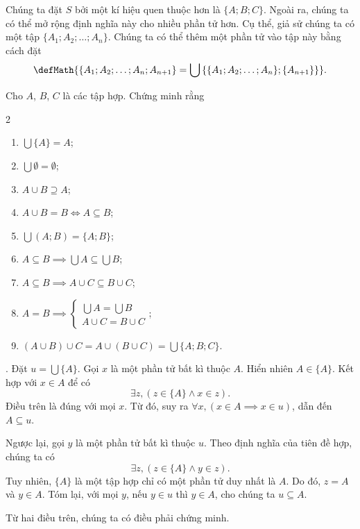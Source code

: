 Chúng ta đặt $S$ bởi một kí hiệu quen thuộc hơn là $\{A; B; C\}$. Ngoài ra, chúng ta có thể mở rộng định nghĩa này cho nhiều phần tử hơn. Cụ thể, giả sử chúng ta có một tập $\{A_1; A_2; \ldots; A_n\}$. Chúng ta có thể thêm một phần tử vào tập này bằng cách đặt $$\defMath{\{A_1; A_2; \ldots; A_n; A_{n+1}\} = \bigcup \left\{\{A_1; A_2; \ldots; A_n\}; \{A_{n+1}\}\right\}}.$$

\exercise Cho $A$, $B$, $C$ là các tập hợp. Chứng minh rằng
\begin{multicols}{2}
   \begin{enumerate}
      \item $\bigcup \{A\} = A$;
      \item $\bigcup \emptyset = \emptyset$;
      \item $A \cup B \supseteq A$;
      \item $A \cup B = B \iff A \subseteq B$;
      \item $\bigcup (A; B) = \{A; B\}$;
      \item $A \subseteq B \implies \bigcup A \subseteq \bigcup B$;
      \item $A \subseteq B \implies A \cup C \subseteq B \cup C$;
      \item $A = B \implies \begin{cases}
                  \bigcup A = \bigcup B \\
                  A \cup C = B \cup C
               \end{cases}$;
      \item $(A \cup B) \cup C = A \cup (B \cup C) = \bigcup \{A; B; C\}$.
   \end{enumerate}
\end{multicols}

\solution

\setcounter{subexercise}{1}
. Đặt $u = \bigcup \{A\}$. Gọi $x$ là một phần tử bất kì thuộc $A$. Hiển nhiên $A \in \{A\}$. Kết hợp với $x \in A$ để có
$$
   \exists z, (z \in \{A\} \land x \in z).
$$
Điều trên là đúng với mọi $x$. Từ đó, suy ra $\forall x, (x \in A \implies x \in u)$, dẫn đến $A \subseteq u$.

Ngược lại, gọi $y$ là một phần tử bất kì thuộc $u$. Theo định nghĩa của tiên đề hợp, chúng ta có
$$
   \exists z, (z \in \{A\} \land y \in z).
$$
Tuy nhiên, $\{A\}$ là một tập hợp chỉ có một phần tử duy nhất là $A$. Do đó, $z = A$ và $y \in A$. Tóm lại, với mọi $y$, nếu $y \in u$ thì $y \in A$, cho chúng ta $u \subseteq A$.

Từ hai điều trên, chúng ta có điều phải chứng minh.

